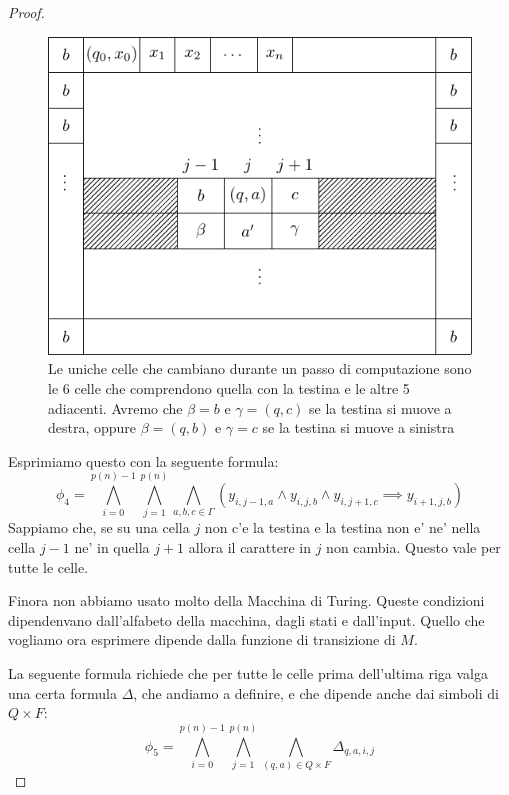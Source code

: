 \begin{proof}
    \begin{figure}[h]
        \begin{center}
            \includegraphics{./img/NPClass/SATproof3.pdf}
            \caption{Le uniche celle che cambiano durante un passo di computazione sono le 6 celle
                che comprendono quella con la testina e le altre 5 adiacenti. Avremo che $\beta = b$ e
                $\gamma = (q,c)$ se la testina si muove a destra, oppure $\beta = (q,b)$ e $\gamma = c$
            se la testina si muove a sinistra}
        \end{center}
    \end{figure}

    Esprimiamo questo con la seguente formula:
    \begin{equation*}
        \phi_{4} = \bigwedge_{i=0}^{p(n)-1}\bigwedge_{j=1}^{p(n)}\bigwedge_{a,b,c\in \Gamma}
        (y_{i,j-1,a} \land y_{i,j,b} \land y_{i,j+1,c} \implies y_{i+1,j,b})
    \end{equation*}
    Sappiamo che, se su una cella $j$ non c'e la testina e la testina non e' ne' nella cella $j-1$
    ne' in quella $j+1$ allora il carattere in $j$ non cambia.  Questo vale per tutte le celle.

    Finora non abbiamo usato molto della Macchina di Turing. Queste condizioni dipendenvano
    dall'alfabeto della macchina, dagli stati e dall'input. Quello che vogliamo ora esprimere
    dipende dalla funzione di transizione di $M$.

    La seguente formula richiede che per tutte le celle prima dell'ultima riga valga una certa
    formula $\Delta$, che andiamo a definire, e che dipende anche dai simboli di $Q \times F$:
    \begin{equation*}
        \phi_{5} = \bigwedge_{i=0}^{p(n)-1}\bigwedge_{j=1}^{p(n)}\bigwedge_{(q,a)\in Q\times F}
        \Delta_{q,a,i,j}
    \end{equation*}


\end{proof}
